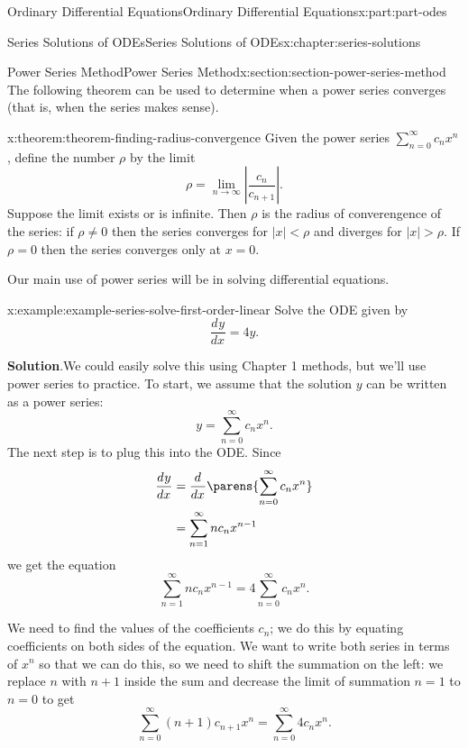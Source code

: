 \documentclass[twoside,10pt,]{book}
\newcommand{\blocktitlefont}{\relax}
\numberwithin{equation}{part}
\providecommand{\dv}[3][]{\dfrac{d^{#1} #2}{d #3^{#1}}}
\newcommand{\limit}[2]{\lim_{#1\to#2}}
\newcommand{\lt}{<}
\newcommand{\gt}{>}
\newcommand{\amp}{&}
\begin{document}
\begin{partptx}{Ordinary Differential Equations}{}{Ordinary Differential Equations}{}{}{x:part:part-odes}
\begin{chapterptx}{Series Solutions of ODEs}{}{Series Solutions of ODEs}{}{}{x:chapter:series-solutions}
\begin{sectionptx}{Power Series Method}{}{Power Series Method}{}{}{x:section:section-power-series-method}
The following theorem can be used to determine when a power series converges (that is, when the series makes sense).%
\begin{theorem}{}{}{x:theorem:theorem-finding-radius-convergence}%
Given the power series \(\sum_{n=0}^{\infty}c_{n}x^{n}\), define the number \(\rho\) by the limit%
\begin{equation*}
\rho = \limit{n}{\infty}\left|\frac{c_{n}}{c_{n+1}}\right|.
\end{equation*}
Suppose the limit exists or is infinite. Then \(\rho\) is the radius of converengence of the series: if \(\rho\neq0\) then the series converges for \(|x|\lt\rho\) and diverges for \(|x|\gt\rho\). If \(\rho=0\) then the series converges only at \(x=0\).%
\end{theorem}
Our main use of power series will be in solving differential equations.%
\begin{example}{}{x:example:example-series-solve-first-order-linear}%
Solve the ODE given by%
\begin{equation*}
\dv{y}{x} = 4y.
\end{equation*}
%
\par\smallskip%
\noindent\textbf{\blocktitlefont Solution}.\hypertarget{g:solution:idp105548817407264}{}\quad{}We could easily solve this using Chapter 1 methods, but we'll use power series to practice. To start, we assume that the solution \(y\) can be written as a power series:%
\begin{equation*}
y = \sum_{n=0}^{\infty}c_{n}x^{n}.
\end{equation*}
The next step is to plug this into the ODE. Since%
\begin{align*}
\dv{y}{x} \amp= \dv{}{x}\parens{\sum_{n=0}^{\infty}c_{n}x^{n}}\\
\amp= \sum_{n=1}^{\infty}nc_{n}x^{n-1}
\end{align*}
we get the equation%
\begin{equation*}
\sum_{n=1}^{\infty}nc_{n}x^{n-1} = 4\sum_{n=0}^{\infty}c_{n}x^{n}\text{.}
\end{equation*}
%
\par
We need to find the values of the coefficients \(c_{n}\); we do this by equating coefficients on both sides of the equation. We want to write both series in terms of \(x^{n}\) so that we can do this, so we need to shift the summation on the left: we replace \(n\) with \(n+1\) inside the sum and decrease the limit of summation \(n=1\) to \(n=0\) to get%
\begin{equation*}
\sum_{n=0}^{\infty}(n+1)c_{n+1}x^{n} = \sum_{n=0}^{\infty}4c_{n}x^{n}\text{.}

\end{equation*}
\end{example}
\end{sectionptx}
\end{chapterptx}
\end{partptx}
\end{document}
